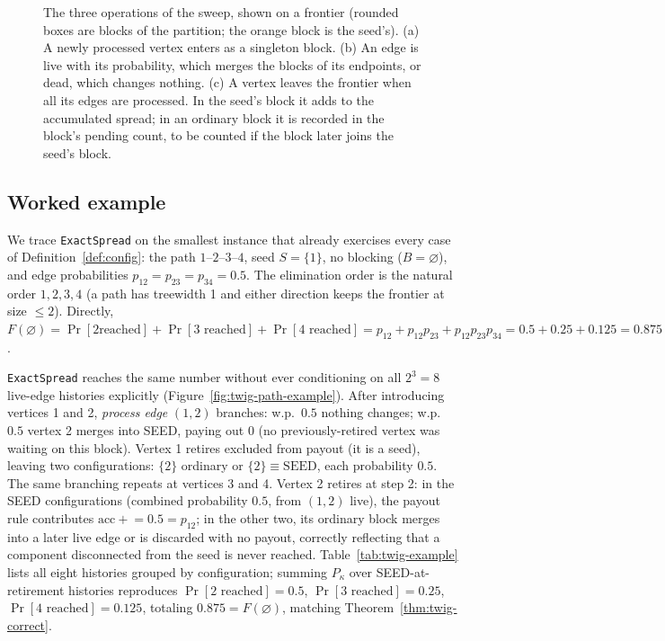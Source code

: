 \documentclass[11pt]{article}
\theoremstyle{definition}
\theoremstyle{remark}
\begin{document}
\begin{figure}[t]
{}
\caption{The three operations of the sweep, shown on a frontier (rounded boxes are blocks of the partition; the orange block is the seed's). (a) A newly processed vertex enters as a singleton block. (b) An edge is live with its probability, which merges the blocks of its endpoints, or dead, which changes nothing. (c) A vertex leaves the frontier when all its edges are processed. In the seed's block it adds to the accumulated spread; in an ordinary block it is recorded in the block's pending count, to be counted if the block later joins the seed's block.}\label{fig:operations}
\end{figure}

\subsection{Worked example}\label{sec:twig-example}

We trace \texttt{ExactSpread} on the smallest instance that already
exercises every case of Definition~\ref{def:config}: the path
$1$--$2$--$3$--$4$, seed $S=\{1\}$, no blocking ($B=\varnothing$), and edge
probabilities $p_{12}=p_{23}=p_{34}=0.5$. The elimination order is the
natural order $1,2,3,4$ (a path has treewidth 1 and either direction keeps
the frontier at size $\le2$). Directly, $F(\varnothing)=\Pr[2\text{
reached}]+\Pr[3\text{ reached}]+\Pr[4\text{ reached}]
=p_{12}+p_{12}p_{23}+p_{12}p_{23}p_{34}=0.5+0.25+0.125=0.875$.

\texttt{ExactSpread} reaches the same number without ever conditioning on
all $2^3=8$ live-edge histories explicitly (Figure~\ref{fig:twig-path-example}).
After introducing vertices 1 and 2, \emph{process edge} $(1,2)$ branches: w.p.\
$0.5$ nothing changes; w.p.\ $0.5$ vertex 2 merges into SEED, paying out
$0$ (no previously-retired vertex was waiting on this block). Vertex 1
retires excluded from payout (it is a seed), leaving two configurations:
$\{2\}$ ordinary or $\{2\}\equiv\mathrm{SEED}$, each probability $0.5$. The
same branching repeats at vertices 3 and 4. Vertex 2 retires at step 2: in
the SEED configurations (combined probability $0.5$, from $(1,2)$ live),
the payout rule contributes $\mathrm{acc}\mathrel{+}=0.5=p_{12}$; in the
other two, its ordinary block merges into a later live edge or is
discarded with no payout, correctly reflecting that a component
disconnected from the seed is never reached. Table~\ref{tab:twig-example}
lists all eight histories grouped by configuration; summing $P_\kappa$
over SEED-at-retirement histories reproduces
$\Pr[2\text{ reached}]=0.5$, $\Pr[3\text{ reached}]=0.25$,
$\Pr[4\text{ reached}]=0.125$, totaling $0.875=F(\varnothing)$, matching
Theorem~\ref{thm:twig-correct}.
\end{document}
